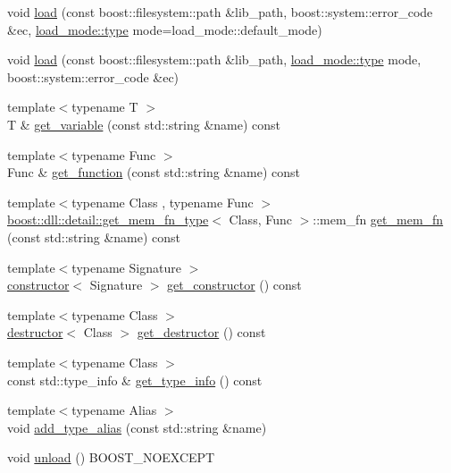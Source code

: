 \begin{DoxyCompactItemize}
\item 
void \hyperlink{a00281_a0743160736368974a420326665b3dc84}{load} (const boost\+::filesystem\+::path \&lib\+\_\+path, boost\+::system\+::error\+\_\+code \&ec, \hyperlink{a00729_a1918a602801479bc0bade54ff5665129}{load\+\_\+mode\+::type} mode=load\+\_\+mode\+::default\+\_\+mode)
\item 
void \hyperlink{a00281_a08af5d7544f4fa43985254c3924df3bd}{load} (const boost\+::filesystem\+::path \&lib\+\_\+path, \hyperlink{a00729_a1918a602801479bc0bade54ff5665129}{load\+\_\+mode\+::type} mode, boost\+::system\+::error\+\_\+code \&ec)
\item 
{\footnotesize template$<$typename T $>$ }\\T \& \hyperlink{a00281_ace3f83412522eb73003c51f000ef40d6}{get\+\_\+variable} (const std\+::string \&name) const 
\item 
{\footnotesize template$<$typename Func $>$ }\\Func \& \hyperlink{a00281_a260ef5b56e36ae2ac98488c6769620be}{get\+\_\+function} (const std\+::string \&name) const 
\item 
{\footnotesize template$<$typename Class , typename Func $>$ }\\\hyperlink{a00131}{boost\+::dll\+::detail\+::get\+\_\+mem\+\_\+fn\+\_\+type}$<$ Class, Func $>$\+::mem\+\_\+fn \hyperlink{a00281_aa966268c4992264a8e446dafb53738f3}{get\+\_\+mem\+\_\+fn} (const std\+::string \&name) const 
\item 
{\footnotesize template$<$typename Signature $>$ }\\\hyperlink{a00063}{constructor}$<$ Signature $>$ \hyperlink{a00281_af05c4ae49b019197dfba5379477cf24c}{get\+\_\+constructor} () const 
\item 
{\footnotesize template$<$typename Class $>$ }\\\hyperlink{a00076}{destructor}$<$ Class $>$ \hyperlink{a00281_a908cd431011d74ab3f6ea1984f99da83}{get\+\_\+destructor} () const 
\item 
{\footnotesize template$<$typename Class $>$ }\\const std\+::type\+\_\+info \& \hyperlink{a00281_a0f201c41218443de1e0096490f7843b2}{get\+\_\+type\+\_\+info} () const 
\item 
{\footnotesize template$<$typename Alias $>$ }\\void \hyperlink{a00281_aa19292156eb6497e10f108fb614d9939}{add\+\_\+type\+\_\+alias} (const std\+::string \&name)
\item 
void \hyperlink{a00281_a2b96d7817794a2adabe1f7bb22be5483}{unload} () B\+O\+O\+S\+T\+\_\+\+N\+O\+E\+X\+C\+E\+PT

\end{DoxyCompactItemize}
